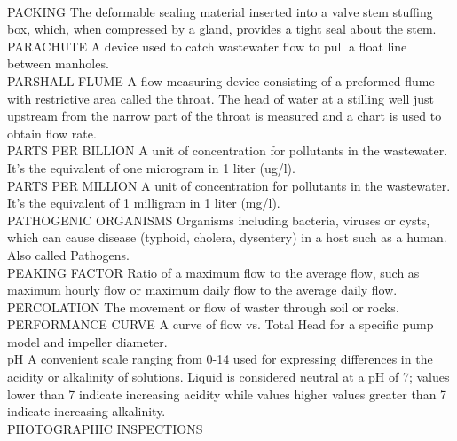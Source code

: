 \documentclass{article}
\begin{document}
\vspace{0.3cm}\\
PACKING
The deformable sealing material inserted into a valve stem stuffing box, which, when compressed by a gland, provides a tight seal about the stem.
\vspace{0.3cm}\\
PARACHUTE
A device used to catch wastewater flow to pull a float line between manholes. 
\vspace{0.3cm}\\
PARSHALL FLUME
A flow measuring device consisting of a preformed flume with restrictive area called the throat. The head of water at a stilling well just upstream from the narrow part of the throat is measured and a chart is used to obtain flow rate.
\vspace{0.3cm}\\
PARTS PER BILLION
A unit of concentration for pollutants in the wastewater. It’s the equivalent of one microgram in 1 liter (ug/l).
\vspace{0.3cm}\\
PARTS PER MILLION
A unit of concentration for pollutants in the wastewater. It’s the equivalent of 1 milligram in 1 liter (mg/l).
\vspace{0.3cm}\\
PATHOGENIC ORGANISMS
Organisms including bacteria, viruses or cysts, which can cause disease (typhoid, cholera, dysentery) in a host such as a human.  Also called Pathogens.
\vspace{0.3cm}\\
PEAKING FACTOR
Ratio of a maximum flow to the average flow, such as maximum hourly flow or maximum daily flow to the average daily flow. 
\vspace{0.3cm}\\
PERCOLATION
The movement or flow of waster through soil or rocks.
\vspace{0.3cm}\\
PERFORMANCE CURVE
A curve of flow vs. Total Head for a specific pump model and impeller diameter.
\vspace{0.3cm}\\
pH
A convenient scale ranging from 0-14 used for expressing differences in the acidity or alkalinity of solutions. Liquid is considered neutral at a pH of 7; values lower than 7 indicate increasing acidity while values higher values greater than 7 indicate increasing alkalinity.
\vspace{0.3cm}\\
PHOTOGRAPHIC INSPECTIONS
\end{document}
